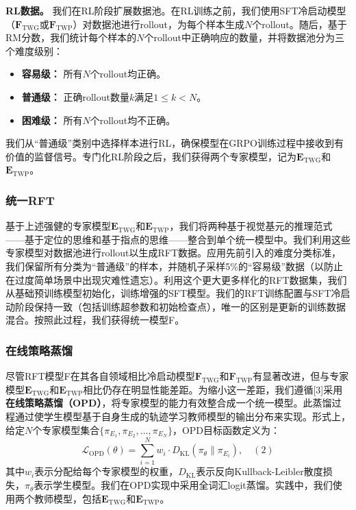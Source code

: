 \documentclass[11pt,a4paper]{article}
\begin{document}
\textbf{RL数据。} 我们在RL阶段扩展数据池。在RL训练之前，我们使用SFT冷启动模型（$\mathbf{F}_{\mathrm{TWG}}$或$\mathbf{F}_{\mathrm{TWP}}$）对数据池进行rollout，为每个样本生成$N$个rollout。随后，基于RM分数，我们统计每个样本的$N$个rollout中正确响应的数量，并将数据池分为三个难度级别：
\begin{itemize}
    \item \textbf{容易级：} 所有$N$个rollout均正确。
    \item \textbf{普通级：} 正确rollout数量$k$满足$1 \leq k < N$。
    \item \textbf{困难级：} 所有$N$个rollout均不正确。
\end{itemize}
我们从“普通级”类别中选择样本进行RL，确保模型在GRPO训练过程中接收到有价值的监督信号。专门化RL阶段之后，我们获得两个专家模型，记为$\mathbf{E}_{\mathrm{TWG}}$和$\mathbf{E}_{\mathrm{TWP}}$。

\subsubsection{统一RFT}

基于上述强健的专家模型$\mathbf{E}_{\mathrm{TWG}}$和$\mathbf{E}_{\mathrm{TWP}}$，我们将两种基于视觉基元的推理范式——基于定位的思维和基于指点的思维——整合到单个统一模型中。我们利用这些专家模型对数据池进行rollout以生成RFT数据。应用先前引入的难度分类标准，我们保留所有分类为“普通级”的样本，并随机子采样5\%的“容易级”数据（以防止在过度简单场景中出现灾难性遗忘）。利用这个更大更多样化的RFT数据集，我们从基础预训练模型初始化，训练增强的SFT模型。我们的RFT训练配置与SFT冷启动阶段保持一致（包括训练超参数和初始检查点），唯一的区别是更新的训练数据混合。按照此过程，我们获得统一模型F。

\subsubsection{在线策略蒸馏}

尽管RFT模型F在其各自领域相比冷启动模型$\mathbf{F}_{\mathrm{TWG}}$和$\mathbf{F}_{\mathrm{TWP}}$有显著改进，但与专家模型$\mathbf{E}_{\mathrm{TWG}}$和$\mathbf{E}_{\mathrm{TWP}}$相比仍存在明显性能差距。为缩小这一差距，我们遵循[3]采用\textbf{在线策略蒸馏（OPD）}，将专家模型的能力有效整合成一个统一模型。此蒸馏过程通过使学生模型基于自身生成的轨迹学习教师模型的输出分布来实现。形式上，给定$N$个专家模型集合$\{\pi_{E_1},\pi_{E_2},\ldots ,\pi_{E_N}\}$，OPD目标函数定义为：
\[
\mathcal{L}_{\mathrm{OPD}}(\theta) = \sum_{i = 1}^{N}w_{i}\cdot D_{\mathrm{KL}}(\pi_{\theta}\parallel \pi_{E_{i}}), \quad (2)
\]
其中$w_{i}$表示分配给每个专家模型的权重，$D_{\mathrm{KL}}$表示反向Kullback-Leibler散度损失，$\pi_{\theta}$表示学生模型。我们在OPD实现中采用全词汇logit蒸馏。实践中，我们使用两个教师模型，包括$\mathbf{E}_{\mathrm{TWG}}$和$\mathbf{E}_{\mathrm{TWP}}$。
\end{document}
